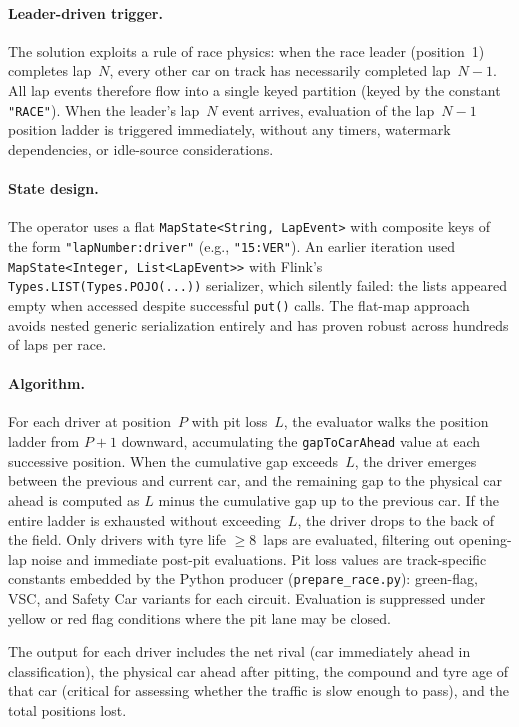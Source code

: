 \documentclass[a4paper,twocolumn]{article}
\begin{document}
\paragraph{Leader-driven trigger.}
The solution exploits a rule of race physics: when the race leader
(position~1) completes lap~$N$, every other car on track has necessarily
completed lap~$N-1$. All lap events therefore flow into a single keyed
partition (keyed by the constant \texttt{"RACE"}). When the leader's
lap~$N$ event arrives, evaluation of the lap~$N-1$ position ladder is
triggered immediately, without any timers, watermark dependencies, or
idle-source considerations.

\paragraph{State design.}
The operator uses a flat \texttt{MapState<String,\,LapEvent>} with
composite keys of the form \texttt{"lapNumber:driver"} (e.g.,
\texttt{"15:VER"}). An earlier iteration used
\texttt{MapState<Integer,\,List<LapEvent>{>}} with Flink's
\texttt{Types.LIST(Types.POJO(...))} serializer, which silently failed:
the lists appeared empty when accessed despite successful \texttt{put()}
calls. The flat-map approach avoids nested generic serialization entirely
and has proven robust across hundreds of laps per race.

\paragraph{Algorithm.}
For each driver at position~$P$ with pit loss~$L$, the evaluator walks
the position ladder from $P+1$ downward, accumulating the
\texttt{gapToCarAhead} value at each successive position. When the
cumulative gap exceeds~$L$, the driver emerges between the previous and
current car, and the remaining gap to the physical car ahead is computed
as $L$ minus the cumulative gap up to the previous car. If the entire
ladder is exhausted without exceeding~$L$, the driver drops to the back
of the field. Only drivers with tyre life $\geq 8$~laps are evaluated,
filtering out opening-lap noise and immediate post-pit evaluations.
Pit loss values are track-specific constants embedded by the Python
producer (\texttt{prepare\_race.py}): green-flag, VSC, and Safety Car
variants for each circuit. Evaluation is suppressed under yellow or red
flag conditions where the pit lane may be closed.

The output for each driver includes the net rival (car immediately ahead
in classification), the physical car ahead after pitting, the compound
and tyre age of that car (critical for assessing whether the traffic is
slow enough to pass), and the total positions lost.
\end{document}
